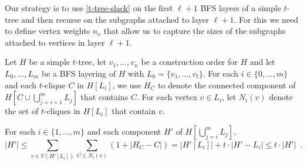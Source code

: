 \documentclass[kpfonts]{patmorin}
\DeclareMathOperator{\stw}{stw}
\newcommand{\trn}{\chi_2}
\theoremstyle{named}
\newcommand{\weirdref}[2]{\cref{#1}#2}
\begin{document}

%
%
%

Our strategy is to use \cref{t-tree-slack} on the first $\ell+1$ BFS layers of a simple $t$-tree and then recurse on the subgraphs attached to layer $\ell+1$.  For this we need to define vertex weights $n_v$ that allow us to capture the sizes of the subgraphs attached to vertices in layer $\ell+1$.

Let $H$ be a simple $t$-tree, let $v_1,\ldots,v_n$ be a construction order for $H$ and let $L_0,\ldots,L_m$ be a BFS layering of $H$ with $L_0=\{v_1,\ldots,v_{t}\}$.  For each $i\in\{0,\ldots,m\}$ and each $t$-clique $C$ in $H[L_i]$, we use $H_C$ to denote the connected component of $H[C\cup\bigcup_{j=i+1}^m L_j]$ that contains $C$.  For each vertex $v\in L_i$, let $N_i(v)$ denote the set of $t$-cliques in $H[L_i]$ that contain $v$.


\begin{clm}\label{size-claim}
    For each $i\in\{1,\ldots,m\}$ and each component $H'$ of $H[\bigcup_{j=i}^m L_j]$,
    \[
        |H'| \le \sum_{v\in V(H'[L_i])} \sum_{C\in N_i(v)}(1+|H_C-C|) = |H'[L_i]| + t\cdot|H'-L_i|
        \le t\cdot|H'| \enspace .
    \]
\end{clm}
\end{document}
